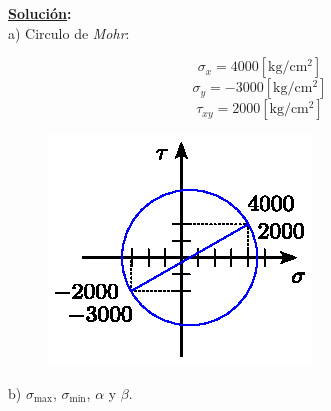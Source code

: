 \documentclass[letter,10pt,twoside]{article}
\begin{document}
\textbf{\underline{Solución}:} \\

a) Circulo de \emph{Mohr}:

\begin{equation*}
    \sigma_x = 4000[\text{kg}/\text{cm}^2]
\end{equation*}
\begin{equation*}
    \sigma_y = -3000[\text{kg}/\text{cm}^2]
\end{equation*}
\begin{equation*}
    \tau_{xy} = 2000[\text{kg}/\text{cm}^2]
\end{equation*}

\begin{figure}[H]
\centering
\includegraphics[scale=1.2]{resources/f21.eps}
\end{figure}

b) $\sigma_{\text{max}}$, $\sigma_{\text{min}}$, $\alpha$ y $\beta$.
\end{document}

